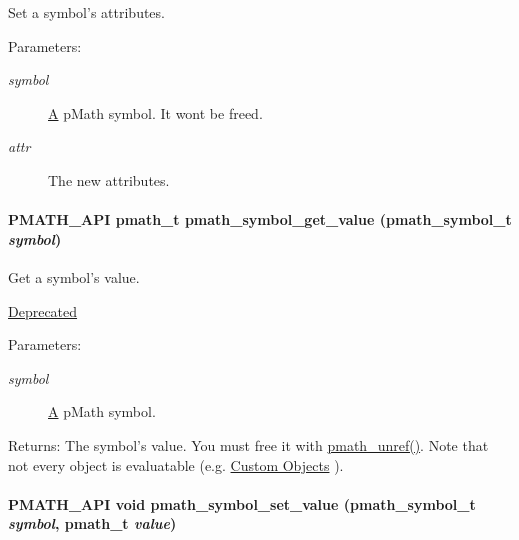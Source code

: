 Set a symbol's attributes. 

\begin{Desc}
\item[Parameters:]
\begin{description}
\item[{\em symbol}]\hyperlink{class_a}{A} pMath symbol. It wont be freed. \item[{\em attr}]The new attributes. \end{description}
\end{Desc}
\hypertarget{group__symbols_gbf330376870422d219ae9f0557e515c2}{
\paragraph[{pmath\_\-symbol\_\-get\_\-value}]{\setlength{\rightskip}{0pt plus 5cm}PMATH\_\-API {\bf pmath\_\-t} pmath\_\-symbol\_\-get\_\-value ({\bf pmath\_\-symbol\_\-t} {\em symbol})}\hfill}
\label{group__symbols_gbf330376870422d219ae9f0557e515c2}


Get a symbol's value. 

\begin{Desc}
\item[\hyperlink{deprecated__deprecated000001}{Deprecated}]\end{Desc}
\begin{Desc}
\item[Parameters:]
\begin{description}
\item[{\em symbol}]\hyperlink{class_a}{A} pMath symbol. \end{description}
\end{Desc}
\begin{Desc}
\item[Returns:]The symbol's value. You must free it with \hyperlink{classpmath__t_54e905402c38940687033b87eb8c6c9f}{pmath\_\-unref()}. Note that not every object is evaluatable (e.g. \hyperlink{group__custom}{Custom Objects} ). \end{Desc}
\hypertarget{group__symbols_g8344005c16b86be82d2efdedb0795a0c}{
\paragraph[{pmath\_\-symbol\_\-set\_\-value}]{\setlength{\rightskip}{0pt plus 5cm}PMATH\_\-API void pmath\_\-symbol\_\-set\_\-value ({\bf pmath\_\-symbol\_\-t} {\em symbol}, \/  {\bf pmath\_\-t} {\em value})}\hfill}
\label{group__symbols_g8344005c16b86be82d2efdedb0795a0c}


